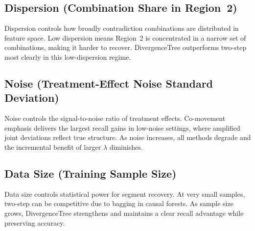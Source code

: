\documentclass[11pt,letterpaper,english]{article}
\theoremstyle{definition}
\theoremstyle{definition}
\begin{document}
\begin{bibunit}
\begin{appendices}
\subsection{Dispersion (Combination Share in Region~2)}
Dispersion controls how broadly contradiction combinations are distributed in feature space. Low dispersion means Region~2 is concentrated in a narrow set of combinations, making it harder to recover. DivergenceTree outperforms two-step most clearly in this low-dispersion regime.


\subsection{Noise (Treatment-Effect Noise Standard Deviation)}
Noise controls the signal-to-noise ratio of treatment effects. Co-movement emphasis delivers the largest recall gains in low-noise settings, where amplified joint deviations reflect true structure. As noise increases, all methods degrade and the incremental benefit of larger $\lambda$ diminishes.


\subsection{Data Size (Training Sample Size)}
Data size controls statistical power for segment recovery. At very small samples, two-step can be competitive due to bagging in causal forests. As sample size grows, DivergenceTree strengthens and maintains a clear recall advantage while preserving accuracy.



\end{appendices}
\end{bibunit}
\end{document}
